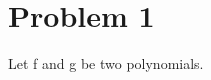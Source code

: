 \documentclass[a4paper,norsk]{article}
\begin{document}
\maketitle

\section*{Problem 1}

Let f and g be two polynomials.
\end{document}
